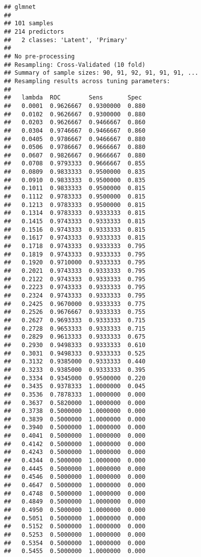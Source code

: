 \documentclass[]{article}
\begin{document}
\begin{verbatim}
## glmnet 
## 
## 101 samples
## 214 predictors
##   2 classes: 'Latent', 'Primary' 
## 
## No pre-processing
## Resampling: Cross-Validated (10 fold) 
## Summary of sample sizes: 90, 91, 92, 91, 91, 91, ... 
## Resampling results across tuning parameters:
## 
##   lambda  ROC        Sens       Spec 
##   0.0001  0.9626667  0.9300000  0.880
##   0.0102  0.9626667  0.9300000  0.880
##   0.0203  0.9626667  0.9466667  0.860
##   0.0304  0.9746667  0.9466667  0.860
##   0.0405  0.9786667  0.9466667  0.880
##   0.0506  0.9786667  0.9666667  0.880
##   0.0607  0.9826667  0.9666667  0.880
##   0.0708  0.9793333  0.9666667  0.855
##   0.0809  0.9833333  0.9500000  0.835
##   0.0910  0.9833333  0.9500000  0.835
##   0.1011  0.9833333  0.9500000  0.815
##   0.1112  0.9783333  0.9500000  0.815
##   0.1213  0.9783333  0.9500000  0.815
##   0.1314  0.9783333  0.9333333  0.815
##   0.1415  0.9743333  0.9333333  0.815
##   0.1516  0.9743333  0.9333333  0.815
##   0.1617  0.9743333  0.9333333  0.815
##   0.1718  0.9743333  0.9333333  0.795
##   0.1819  0.9743333  0.9333333  0.795
##   0.1920  0.9710000  0.9333333  0.795
##   0.2021  0.9743333  0.9333333  0.795
##   0.2122  0.9743333  0.9333333  0.795
##   0.2223  0.9743333  0.9333333  0.795
##   0.2324  0.9743333  0.9333333  0.795
##   0.2425  0.9670000  0.9333333  0.775
##   0.2526  0.9676667  0.9333333  0.755
##   0.2627  0.9693333  0.9333333  0.715
##   0.2728  0.9653333  0.9333333  0.715
##   0.2829  0.9613333  0.9333333  0.675
##   0.2930  0.9498333  0.9333333  0.610
##   0.3031  0.9498333  0.9333333  0.525
##   0.3132  0.9385000  0.9333333  0.440
##   0.3233  0.9385000  0.9333333  0.395
##   0.3334  0.9345000  0.9500000  0.220
##   0.3435  0.9378333  1.0000000  0.045
##   0.3536  0.7878333  1.0000000  0.000
##   0.3637  0.5820000  1.0000000  0.000
##   0.3738  0.5000000  1.0000000  0.000
##   0.3839  0.5000000  1.0000000  0.000
##   0.3940  0.5000000  1.0000000  0.000
##   0.4041  0.5000000  1.0000000  0.000
##   0.4142  0.5000000  1.0000000  0.000
##   0.4243  0.5000000  1.0000000  0.000
##   0.4344  0.5000000  1.0000000  0.000
##   0.4445  0.5000000  1.0000000  0.000
##   0.4546  0.5000000  1.0000000  0.000
##   0.4647  0.5000000  1.0000000  0.000
##   0.4748  0.5000000  1.0000000  0.000
##   0.4849  0.5000000  1.0000000  0.000
##   0.4950  0.5000000  1.0000000  0.000
##   0.5051  0.5000000  1.0000000  0.000
##   0.5152  0.5000000  1.0000000  0.000
##   0.5253  0.5000000  1.0000000  0.000
##   0.5354  0.5000000  1.0000000  0.000
##   0.5455  0.5000000  1.0000000  0.000

\end{verbatim}
\end{document}
